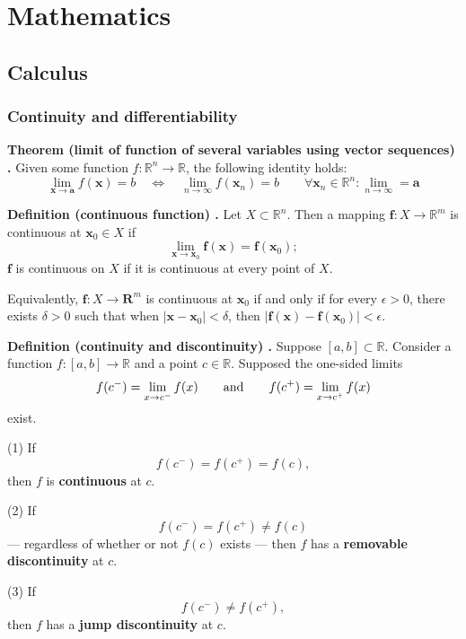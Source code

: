 \chapter{Mathematics}
\section{Calculus}

\subsection{Continuity and differentiability}

\begin{shaded}
\textbf{Theorem (limit of function of several variables using vector sequences) \cite{math2111_notes}.} Given some function $f : \mathbb{R}^n \to \mathbb{R}$, the following identity holds:
$$
    \lim_{\mathbf{x} \to \mathbf{a}} f(\mathbf{x}) = b \quad
    \iff \quad \lim_{n \to \infty} f(\mathbf{x}_n) = b \qquad
    \forall \mathbf{x}_n \in \mathbb{R}^n : \lim_{n \to \infty} = \mathbf{a}
$$
\end{shaded}

\begin{shaded}
\textbf{Definition (continuous function) \cite{hubbard_hubbard}.} Let $X \subset \mathbb{R}^n$. Then a mapping $\mathbf{f} : X \to \mathbb{R}^m$ is continuous at $\mathbf{x}_0 \in X$ if
$$ \lim_{\mathbf{x} \to \mathbf{x}_0} \mathbf{f}(\mathbf{x}) = \mathbf{f}(\mathbf{x}_0); $$
$\mathbf{f}$ is continuous on $X$ if it is continuous at every point of $X$.

Equivalently, $\mathbf{f}: X \to \mathbf{R}^m$ is continuous at $\mathbf{x}_0$ if and only if for every $\epsilon > 0$, there exists $\delta > 0$ such that when $|\mathbf{x} - \mathbf{x}_0| < \delta$, then $|\mathbf{f}(\mathbf{x}) - \mathbf{f}(\mathbf{x}_0)| < \epsilon$.
\end{shaded}

\begin{shaded}
\textbf{Definition (continuity and discontinuity) \cite{math2111_notes}.} Suppose $[a, b] \subset \mathbb{R}$. Consider a function $f : [a, b] \to \mathbb{R}$ and a point $c \in \mathbb{R}$. Supposed the one-sided limits
$$ f(c^-) = \lim_{x \to c^-} f(x) \qquad \textnormal{and} \qquad f(c^+) = \lim_{x \to c^+} f(x) $$
exist.

(1) If
$$ f(c^-) = f(c^+) = f(c) , $$
then $f$ is \textbf{continuous} at $c$.

(2) If
$$ f(c^-) = f(c^+) \not= f(c) $$
--- regardless of whether or not $f(c)$ exists --- then $f$ has a \textbf{removable discontinuity} at $c$.

(3) If
$$ f(c^-) \not= f(c^+) , $$
then $f$ has a \textbf{jump discontinuity} at $c$.
\end{shaded}

